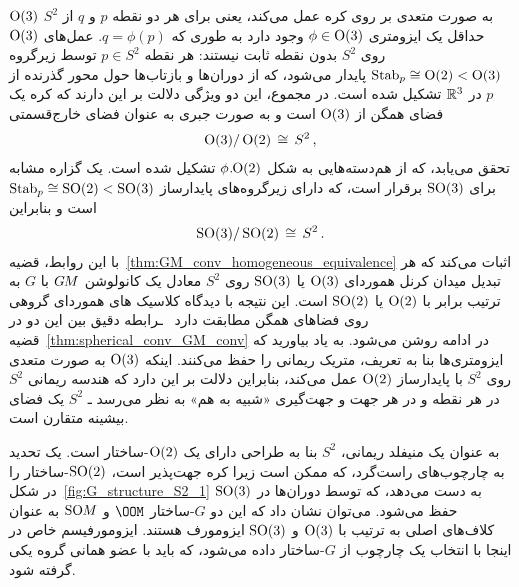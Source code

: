 $\operatorname{O}(3)$ به صورت متعدی بر روی کره عمل می‌کند، یعنی برای هر دو نقطه $p$ و $q$ از $S^2$ حداقل یک ایزومتری $\phi\in\operatorname{O}(3)$ وجود دارد به طوری که $q = \phi(p)$.
عمل‌های $\operatorname{O}(3)$ روی $S^2$ بدون نقطه ثابت نیستند:
هر نقطه $p\in S^2$ توسط زیرگروه $\operatorname{Stab}_{p} \cong \operatorname{O}(2) < \operatorname{O}(3)$ پایدار می‌شود، که از دوران‌ها و بازتاب‌ها حول محور گذرنده از $p$ در $\mathbb{R}^3$ تشکیل شده است.
در مجموع، این دو ویژگی دلالت بر این دارند که کره یک فضای همگن از $\operatorname{O}(3)$ است و به صورت جبری به عنوان فضای خارج‌قسمتی
\begin{align}
    \operatorname{O}(3)/\operatorname{O}(2) \,\cong\, S^2 \,,
\end{align}
تحقق می‌یابد، که از هم‌دسته‌هایی به شکل ${\phi\mkern1mu.\mkern-4mu\operatorname{O}(2)}$ تشکیل شده است.
یک گزاره مشابه برای $\operatorname{SO}(3)$ برقرار است، که دارای زیرگروه‌های پایدارساز $\operatorname{Stab}_{p} \cong \operatorname{SO}(2) < \operatorname{SO}(3)$ است و بنابراین
\begin{align}
    \operatorname{SO}(3)/\operatorname{SO}(2) \,\cong\, S^2 \,.
\end{align}
با این روابط، قضیه~\ref{thm:GM_conv_homogeneous_equivalence} اثبات می‌کند که هر تبدیل میدان کرنل هموردای $\operatorname{O}(3)$ یا $\operatorname{SO}(3)$ روی $S^2$ معادل یک کانولوشن $G\mkern-1.4muM$ با $G$ به ترتیب برابر با $\operatorname{O}(2)$ یا $\operatorname{SO}(2)$ است.
این نتیجه با دیدگاه کلاسیک های هموردای گروهی روی فضاهای همگن مطابقت دارد~\cite{Cohen2019-generaltheory} ـرابطه دقیق بین این دو در قضیه~\ref{thm:spherical_conv_GM_conv} در ادامه روشن می‌شود.
به یاد بیاورید که ایزومتری‌ها بنا به تعریف، متریک ریمانی را حفظ می‌کنند.
اینکه $\operatorname{O}(3)$ به صورت متعدی روی $S^2$ با پایدارساز $\operatorname{O}(2)$ عمل می‌کند، بنابراین دلالت بر این دارد که هندسه ریمانی $S^2$ در هر نقطه و در هر جهت و جهت‌گیری «شبیه به هم» به نظر می‌رسد ـ $S^2$ یک فضای بیشینه متقارن است.


به عنوان یک منیفلد ریمانی، $S^2$ بنا به طراحی دارای یک $\operatorname{O}(2)$-ساختار است.
یک تحدید به چارچوب‌های راست‌گرد، که ممکن است زیرا کره جهت‌پذیر است، $\operatorname{SO}(2)$-ساختار را در شکل~\ref{fig:G_structure_S2_1} به دست می‌دهد، که توسط دوران‌ها در $\operatorname{SO}(3)$ حفظ می‌شود.
می‌توان نشان داد که این دو $G$-ساختار $\OOM$ و $\operatorname{SO}\mkern-3.6muM$ به عنوان کلاف‌های اصلی به ترتیب با $\operatorname{O}(3)$ و $\operatorname{SO}(3)$ ایزومورف هستند.
ایزومورفیسم خاص در اینجا با انتخاب یک چارچوب از $G$-ساختار داده می‌شود، که باید با عضو همانی گروه یکی گرفته شود.

